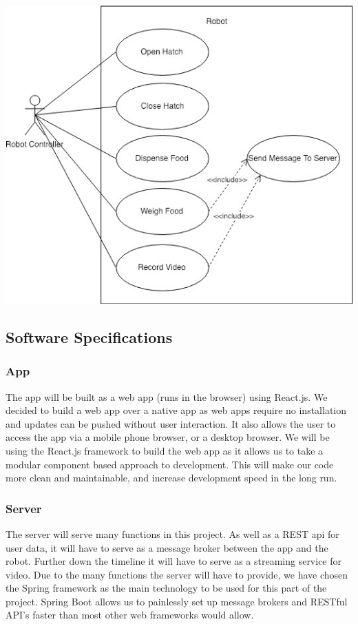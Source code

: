     \includegraphics[width=14cm]{UseCaseDiagram1.jpg}
    
    
    \subsection{Software Specifications}
        \subsubsection{App}
        The app will be built as a web app (runs in the browser) using React.js. We decided to build a web app over a native app as web apps require no installation and updates can be pushed without user interaction. It also allows the user to access the app via a mobile phone browser, or a desktop browser. We will be using the React.js framework to build the web app as it allows us to take a modular component based approach to development. This will make our code more clean and maintainable, and increase development speed in the long run.

        
        \subsubsection{Server}
        The server will serve many functions in this project. As well as a REST api for user data, it will have to serve as a message broker between the app and the robot. Further down the timeline it will have to serve as a streaming service for video. Due to the many functions the server will have to provide, we have chosen the Spring framework as the main technology to be used for this part of the project. Spring Boot allows us to painlessly set up message brokers and RESTful API’s faster than most other web frameworks would allow. 


